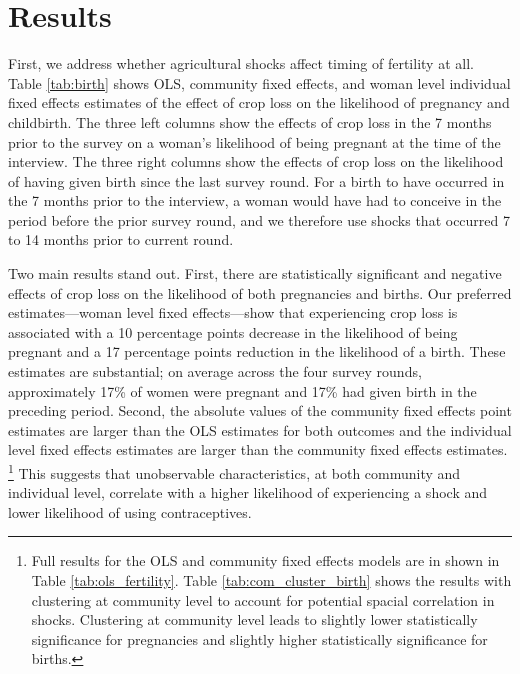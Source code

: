 \documentclass[letterpaper,12pt]{article}
\begin{document}
\section{Results}


First, we address whether agricultural shocks affect timing of fertility at all.
Table \ref{tab:birth} shows OLS, community fixed effects, and woman level individual 
fixed effects estimates of the effect of crop loss on the likelihood of pregnancy 
and childbirth.
The three left columns show the effects of crop loss in the 7 months prior to the
survey on a woman's likelihood of being pregnant at the time of the interview.
The three right columns show the effects of crop loss on the likelihood of having given 
birth since the last survey round. 
For a birth to have occurred in the 7 months prior to the interview, a woman would have
had to conceive in the period before the prior survey round, and we therefore use shocks
that occurred 7 to 14 months prior to current round.





Two main results stand out.
First, there are statistically significant and negative effects of crop loss on the
likelihood of both pregnancies and births.
Our preferred estimates---woman level fixed effects---show that experiencing 
crop loss is associated with a 10 percentage points decrease in the likelihood 
of being pregnant and a 17 percentage points reduction in the likelihood of a birth.
These estimates are substantial; on average across the four survey rounds, approximately 
17\% of women were pregnant and 17\% had given birth in the preceding period. 
Second, the absolute values of the community fixed effects point estimates are 
larger than the OLS estimates for both outcomes and the individual level
fixed effects estimates are larger than the community fixed effects estimates.%
\footnote{
Full results for the OLS and community fixed effects models are in shown in 
Table \ref{tab:ols_fertility}.
Table \ref{tab:com_cluster_birth} shows the results with clustering at community level
to account for potential spacial correlation in shocks.
Clustering at community level leads to slightly lower statistically significance 
for pregnancies and slightly higher statistically significance for births.
}
This suggests that unobservable characteristics, at both community
and individual level, correlate with a higher likelihood of experiencing 
a shock and lower likelihood of using contraceptives.
\end{document}
